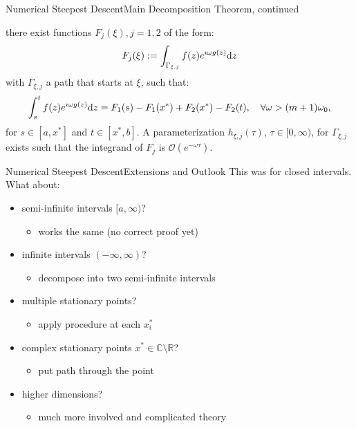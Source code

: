 \documentclass{beamer}
\begin{document}
\begin{frame}{Numerical Steepest Descent}{Main Decomposition Theorem, continued}
  \begin{theorem}
    there exist functions $F_j(\xi), j = 1, 2$ of the form:
    \begin{equation*}
      F_j(\xi) := \int_{\Gamma_{\xi,j}} f(z) e^{\imath \omega g(z)} \mathrm{d}z
    \end{equation*}
    with $\Gamma_{\xi,j}$ a path that starts at $\xi$, such that:
    \begin{equation*}
      \int_s^t f(z) e^{\imath \omega g(z)} \mathrm{d}z =
      F_1(s) - F_1(x^{*}) + F_2(x^{*}) - F_2(t), \quad \forall \omega > (m+1)\omega_0,
    \end{equation*}
    for $s \in [a, x^{*}]$ and $t \in [x^{*}, b]$. A parameterization
    $h_{\xi,j}(\tau)$, $\tau \in [0, \infty)$, for $\Gamma_{\xi,j}$ exists such that
    the integrand of $F_{j}$ is $\mathcal{O}(e^{−\omega \tau})$.
  \end{theorem}
\end{frame}


\begin{frame}{Numerical Steepest Descent}{Extensions and Outlook}
  This was for closed intervals. What about:
  \vspace{0.2cm}
  \begin{itemize}
    \item semi-infinite intervals $[a, \infty)$?
    \begin{itemize}
      \item works the same (no correct proof yet)
    \end{itemize}
    \item infinite intervals $(-\infty, \infty)$?
    \begin{itemize}
      \item decompose into two semi-infinite intervals
    \end{itemize}
    \item multiple stationary points?
    \begin{itemize}
      \item apply procedure at each $x^{*}_i$
    \end{itemize}
    \item complex stationary points $x^{*} \in \mathbb{C} \setminus \mathbb{R}$?
    \begin{itemize}
      \item put path through the point
    \end{itemize}
    \item higher dimensions?
    \begin{itemize}
      \item much more involved and complicated theory
    \end{itemize}
  \end{itemize}
\end{frame}
\end{document}
